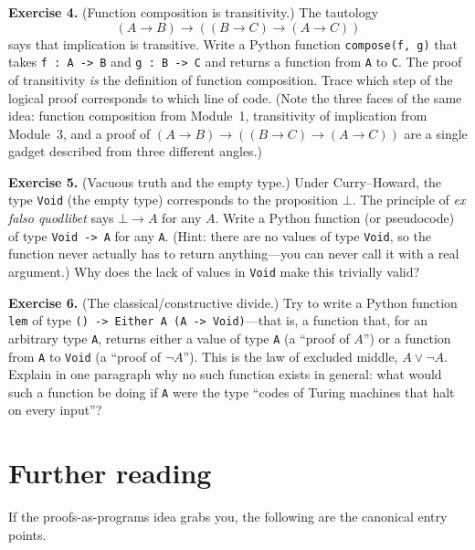 \documentclass[11pt]{article}
\begin{document}
\bigskip
\textbf{Exercise 4.}\label{ex:ch:4} (Function composition is transitivity.) The tautology
\[
  (A \to B) \to ((B \to C) \to (A \to C))
\]
says that implication is transitive. Write a Python function \texttt{compose(f, g)} that takes \texttt{f : A -> B} and \texttt{g : B -> C} and returns a function from \texttt{A} to \texttt{C}. The proof of transitivity \emph{is} the definition of function composition. Trace which step of the logical proof corresponds to which line of code. (Note the three faces of the same idea: function composition from Module~1, transitivity of implication from Module~3, and a proof of $(A \to B) \to ((B \to C) \to (A \to C))$ are a single gadget described from three different angles.)

\bigskip
\textbf{Exercise 5.}\label{ex:ch:5} (Vacuous truth and the empty type.) Under Curry--Howard, the type \texttt{Void} (the empty type) corresponds to the proposition $\bot$. The principle of \emph{ex falso quodlibet} says $\bot \to A$ for any $A$. Write a Python function (or pseudocode) of type \texttt{Void -> A} for any \texttt{A}. (Hint: there are no values of type \texttt{Void}, so the function never actually has to return anything---you can never call it with a real argument.) Why does the lack of values in \texttt{Void} make this trivially valid?

\bigskip
\textbf{Exercise 6.}\label{ex:ch:6} (The classical/constructive divide.) Try to write a Python function \texttt{lem} of type \texttt{() -> Either A (A -> Void)}---that is, a function that, for an arbitrary type \texttt{A}, returns either a value of type \texttt{A} (a ``proof of $A$'') or a function from \texttt{A} to \texttt{Void} (a ``proof of $\lnot A$''). This is the law of excluded middle, $A \vee \lnot A$. Explain in one paragraph why no such function exists in general: what would such a function be doing if \texttt{A} were the type ``codes of Turing machines that halt on every input''?

\section*{Further reading}

If the proofs-as-programs idea grabs you, the following are the canonical entry points.
\end{document}
